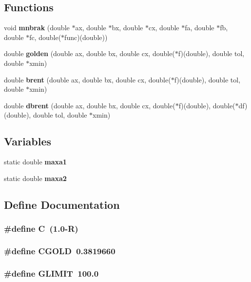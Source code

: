 \subsection*{Functions}
\begin{CompactItemize}
\item 
void {\bf mnbrak} (double $\ast$ax, double $\ast$bx, double $\ast$cx, double $\ast$fa, double $\ast$fb, double $\ast$fc, double($\ast$func)(double))
\item 
double {\bf golden} (double ax, double bx, double cx, double($\ast$f)(double), double tol, double $\ast$xmin)
\item 
double {\bf brent} (double ax, double bx, double cx, double($\ast$f)(double), double tol, double $\ast$xmin)
\item 
double {\bf dbrent} (double ax, double bx, double cx, double($\ast$f)(double), double($\ast$df)(double), double tol, double $\ast$xmin)
\end{CompactItemize}
\subsection*{Variables}
\begin{CompactItemize}
\item 
static double {\bf maxa1}
\item 
static double {\bf maxa2}
\end{CompactItemize}


\subsection{Define Documentation}
\subsubsection{\setlength{\rightskip}{0pt plus 5cm}\#define C~(1.0-R)}\label{nrmin_8c_c4cf4b2ab929bd23951a8676eeac086b}


\subsubsection{\setlength{\rightskip}{0pt plus 5cm}\#define CGOLD~0.3819660}\label{nrmin_8c_84b6d4f75b738c61f98e4d28db6a8ad3}


\subsubsection{\setlength{\rightskip}{0pt plus 5cm}\#define GLIMIT~100.0}\label{nrmin_8c_b08072801a249ee2058194bb698c85a3}


